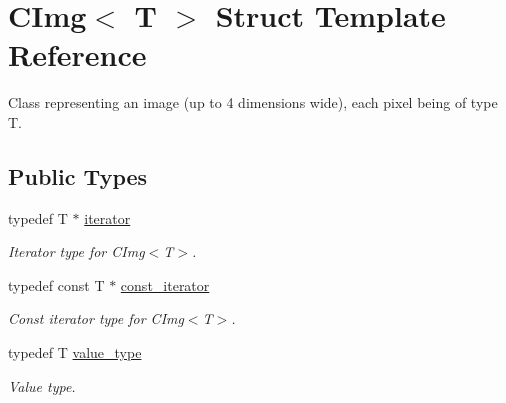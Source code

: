 \hypertarget{structcimg__library_1_1CImg}{
\section{CImg$<$ T $>$ Struct Template Reference}
\label{structcimg__library_1_1CImg}
}


Class representing an image (up to 4 dimensions wide), each pixel being of type {\ttfamily T}.  


\subsection*{Public Types}
\begin{DoxyCompactItemize}
\item 
typedef T $\ast$ \hyperlink{structcimg__library_1_1CImg_a35c955cacac6aacaa1e82874b1628865}{iterator}
\begin{DoxyCompactList}\small\item\em Iterator type for CImg$<$T$>$. \item\end{DoxyCompactList}\item 
typedef const T $\ast$ \hyperlink{structcimg__library_1_1CImg_a2fc97dce62b7053449cc868607540dba}{const\_\-iterator}
\begin{DoxyCompactList}\small\item\em Const iterator type for CImg$<$T$>$. \item\end{DoxyCompactList}\item 
\hypertarget{structcimg__library_1_1CImg_a265a253612b46abed17c61b0a5e5ce30}{
typedef T \hyperlink{structcimg__library_1_1CImg_a265a253612b46abed17c61b0a5e5ce30}{value\_\-type}}
\label{structcimg__library_1_1CImg_a265a253612b46abed17c61b0a5e5ce30}

\begin{DoxyCompactList}\small\item\em Value type. \item\end{DoxyCompactList}\end{DoxyCompactItemize}
